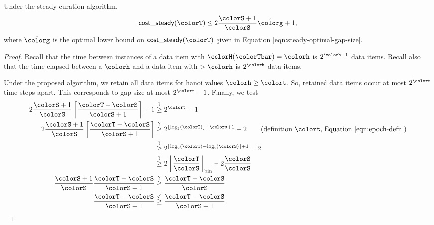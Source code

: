 \begin{theorem}
\label{thm:steady-gap-size}
Under the steady curation algorithm,
\begin{align*}
\mathsf{cost\_steady}(\colorT) \leq 2 \frac{\colorS + 1}{\colorS} \hat{\colorg} + 1,
\end{align*}
where $\hat{\colorg}$ is the optimal lower bound on $\mathsf{cost\_steady}(\colorT)$ given in Equation \ref{eqn:steady-optimal-gap-size}.
\end{theorem}
\begin{proof}
Recall that the time between instances of a data item with \hv{} $\colorH(\colorTbar) = \colorh$ is $2^{\colorh + 1}$ data items.
Recall also that the time elapsed between a \hv{} $\colorh$ and a data item with \hv{} $>\colorh$ is $2^{\colorh}$ data items.

Under the proposed algorithm, we retain all data items for hanoi values $\colorh \geq \colort$.
So, retained data items occur at most $2^{\colort}$ time steps apart.
This corresponds to gap size at most $2^{\colort} - 1$.
Finally, we test
\begin{align*}
2 \frac{\colorS + 1}{\colorS} \left\lceil \frac{\colorT - \colorS}{\colorS + 1} \right\rceil + 1
&\stackrel{?}{\geq}
2^{\colort} - 1\\
2 \frac{\colorS + 1}{\colorS} \left\lceil \frac{\colorT - \colorS}{\colorS + 1} \right\rceil
&\stackrel{?}{\geq}
2^{\left\lfloor \log_2(\colorT) \right\rfloor - \colors + 1} - 2 \tag{definition $\colort$, Equation \ref{eqn:epoch-defn}}\\
&\stackrel{?}{\geq}
2^{\left\lfloor \log_2(\colorT) - \log_2(\colorS) \right\rfloor + 1} - 2\\
&\stackrel{?}{\geq}
2\left\lfloor \frac{\colorT}{\colorS} \right\rfloor_{\mathrm{bin}} - 2\frac{\colorS}{\colorS}\\
\frac{\colorS + 1}{\colorS} \frac{\colorT - \colorS}{\colorS + 1}
&\stackrel{?}{\geq}
\frac{\colorT - \colorS}{\colorS}\\
\frac{\colorT - \colorS}{\colorS + 1}
&\stackrel{\checkmark}{\geq}
\frac{\colorT - \colorS}{\colorS + 1}.
\end{align*}
\end{proof}



